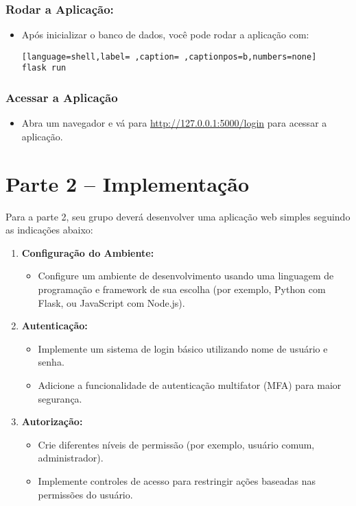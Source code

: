 \documentclass{scrartcl}
\begin{document}
\subsubsection{Rodar a Aplicação:}
\label{sec:org9b8bd6e}
\begin{itemize}
\item Após inicializar o banco de dados, você pode rodar a aplicação com:
\begin{lstlisting}[language=shell,label= ,caption= ,captionpos=b,numbers=none]
flask run
\end{lstlisting}
\end{itemize}

\subsubsection{Acessar a Aplicação}
\label{sec:org95ee108}
\begin{itemize}
\item Abra um navegador e vá para \url{http://127.0.0.1:5000/login} para acessar a
aplicação.
\end{itemize}


\section{Parte 2 -- Implementação}
\label{sec:org16fc0f0}

Para a parte 2, seu grupo deverá desenvolver uma aplicação web simples seguindo
as indicações abaixo:

\begin{enumerate}
\item \textbf{\textbf{Configuração do Ambiente:}}
\begin{itemize}
\item Configure um ambiente de desenvolvimento usando uma linguagem de
programação e framework de sua escolha (por exemplo, Python com Flask, ou
JavaScript com Node.js).
\end{itemize}
\item \textbf{\textbf{Autenticação:}}
\begin{itemize}
\item Implemente um sistema de login básico utilizando nome de usuário e senha.
\item Adicione a funcionalidade de autenticação multifator (MFA) para maior segurança.
\end{itemize}
\item \textbf{\textbf{Autorização:}}
\begin{itemize}
\item Crie diferentes níveis de permissão (por exemplo, usuário comum,
administrador).
\item Implemente controles de acesso para restringir ações baseadas nas
permissões do usuário.
\end{itemize}
\end{enumerate}
\end{document}
